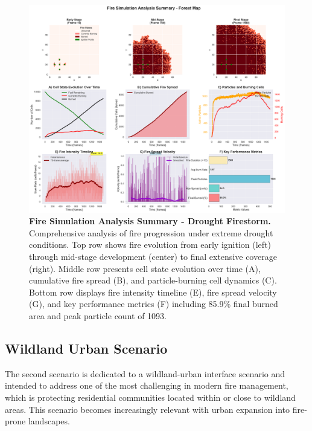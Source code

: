 \begin{figure}[H]
	\centering
	\includegraphics[width=\textwidth]{media/report_summary_df.png}
	\caption{
		\textbf{Fire Simulation Analysis Summary - Drought Firestorm.}
		Comprehensive analysis of fire progression under extreme drought conditions. Top row shows fire evolution from early ignition (left) through mid-stage development (center) to final extensive coverage (right). Middle row presents cell state evolution over time (A), cumulative fire spread (B), and particle-burning cell dynamics (C). Bottom row displays fire intensity timeline (E), fire spread velocity (G), and key performance metrics (F) including 85.9\% final burned area and peak particle count of 1093.
	}
	\label{fig:res_df}
\end{figure}

\subsection{Wildland Urban Scenario}
The second scenario is dedicated to a wildland-urban interface scenario and intended to address one of the most challenging in modern fire management, which is protecting residential communities located within or close to wildland areas. This scenario becomes increasingly relevant with urban expansion into fire-prone landscapes.
